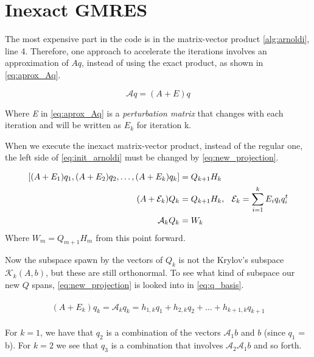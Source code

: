 \section{Inexact GMRES}



The most expensive part in the code is in the matrix-vector product \ref{alg:arnoldi}, line 4. Therefore, one approach to accelerate the iterations involves an approximation of $Aq $, instead of using the exact product, as shown in \ref{eq:aprox_Aq}.

\begin{equation}\label{eq:aprox_Aq}
    \mathcal{A}q = (A + E)q
\end{equation}

Where \textit{E} in \ref{eq:aprox_Aq} is a \textit{perturbation matrix} that changes with each iteration and will be written as $E_{k}$ for iteration k.

When we execute the inexact matrix-vector product, instead of the regular one, the left side of \ref{eq:init_arnoldi} must be changed by \ref{eq:new_projection}.


\begin{align} \label{eq:new_projection}
    \begin{split}
        [(A + E_{1})q_{1}, (A + E_{2})q_{2},\dots, (A + E_{k})q_{k}] &= Q_{k+1}H_{k}\\
        (A + \mathcal{E}_{k})Q_{k} &= Q_{k+1}H_{k}, \hspace{0.1in} \mathcal{E}_{k} = \sum_{i=1}^{k}E_{i}q_{i}q_{i}^{t}\\
        \mathcal{A}_{k}Q_{k} &= W_{k}
    \end{split}
\end{align}
Where $W_{m} = Q_{m+1}H_{m}$ from this point forward.

Now the subspace spawn by the vectors of $Q_{k}$ is not the Krylov's subspace $\mathcal{K}_{k}(A,b)$, but these are still orthonormal.  To see what kind of subspace our new $Q$ spans, \ref{eq:new_projection} is looked into in \ref{eq:q_basis}.

\begin{align}\label{eq:q_basis}
    \begin{split}
        (A + E_{k})q_{k}=\mathcal{A}_{k} q_{k} = h_{1,k}q_{1} + h_{2,k}q_{2} + \dots + h_{k+1,k}q_{k+1}
    \end{split}
\end{align}

For $k=1$, we have that $q_{2}$ is a combination of the vectors $\mathcal{A}_{1}b$ and $b$ (since $q_{1}$ = b). For $k=2$ we see that $q_{3}$ is a combination that involves $\mathcal{A}_{2} \mathcal{A}_{1}b$ and so forth.

